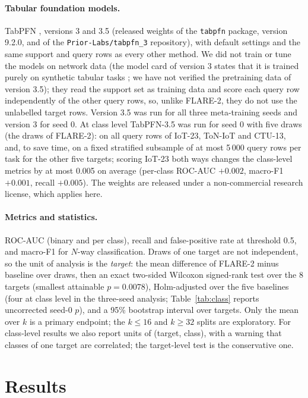 \documentclass[11pt]{article}
\begin{document}
\paragraph{Tabular foundation models.}
TabPFN \citep[the family of][]{hollmann2025tabpfn}, versions 3 and 3.5 (released weights of the \texttt{tabpfn} package, version 9.2.0, and of the \texttt{Prior-Labs/tabpfn\_3} repository), with default settings and the same support and query rows as every other method.
We did not train or tune the models on network data (the model card of version 3 states that it is trained purely on synthetic tabular tasks \citep{priorlabs2026tabpfn3}; we have not verified the pretraining data of version 3.5); they read the support set as training data and score each query row independently of the other query rows, so, unlike FLARE-2, they do not use the unlabelled target rows.
Version 3.5 was run for all three meta-training seeds and version 3 for seed 0.
At class level TabPFN-3.5 was run for seed 0 with five draws (the draws of FLARE-2): on all query rows of IoT-23, ToN-IoT and CTU-13, and, to save time, on a fixed stratified subsample of at most 5\,000 query rows per task for the other five targets; scoring IoT-23 both ways changes the class-level metrics by at most 0.005 on average (per-class ROC-AUC $+0.002$, macro-F1 $+0.001$, recall $+0.005$).
The weights are released under a non-commercial research license, which applies here.
\paragraph{Metrics and statistics.}
ROC-AUC (binary and per class), recall and false-positive rate at threshold 0.5, and macro-F1 for $N$-way classification.
Draws of one target are not independent, so the unit of analysis is the \emph{target}: the mean difference of FLARE-2 minus baseline over draws, then an exact two-sided Wilcoxon signed-rank test over the 8 targets (smallest attainable $p=0.0078$), Holm-adjusted over the five baselines (four at class level in the three-seed analysis; Table~\ref{tab:class} reports uncorrected seed-0 $p$), and a 95\% bootstrap interval over targets. Only the mean over $k$ is a primary endpoint; the $k\le16$ and $k\ge32$ splits are exploratory.
For class-level results we also report units of (target, class), with a warning that classes of one target are correlated; the target-level test is the conservative one.

\section{Results}
\end{document}
